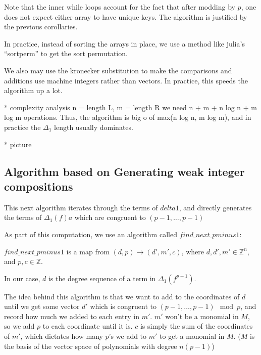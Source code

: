 Note that the inner while loops account for the fact that
after modding by \(p\), one does not expect 
either array to have unique keys.
The algorithm is justified by the previous corollaries.

In practice, instead of sorting the arrays in place, 
we use a method like julia's ``sortperm''
to get the sort permutation.

We also may use the kronecker substitution to make
the comparisons and additions use machine integers
rather than vectors.
In practice, this speeds the algorithm up a lot.

* complexity analysis
n = length L, m = length R
we need n + m + n log n + m log m operations.
Thus, the algorithm is big o of max(n log n, m log m),
and in practice the \(\Delta_{1}\) length
usually dominates.

* picture

\subsection{Algorithm based on Generating weak integer compositions}

This next algorithm iterates through the terms of $delta1$, and directly generates the terms of $\Delta_1(f)a$ which are congruent to $(p - 1, \dots, p - 1)$

As part of this computation, we use an algorithm called $find\_next\_pminus1$:

\begin{alg}
    $find\_next\_pminus1$ is a map from $(d, p) \rightarrow (d', m', c)$, where $d, d', m' \in \mathbb{Z}^n$, and $p, c \in \mathbb{Z}$.
\end{alg}

In our case, $d$ is the degree sequence of a term in $\Delta_{1}(f ^ {p - 1})$.

The idea behind this algorithm is that we want to add to the coordinates of $d$ until we get some vector $d'$ which is congruent to $(p - 1, \dots, p - 1) \mod p$, and record how much we added to each entry in $m'$. $m'$ won't be a monomial in $M$, so we add $p$ to each coordinate until it is. $c$ is simply the sum of the coordinates of $m'$, which dictates how many $p$'s we add to $m'$ to get a monomial in $M$. ($M$ is the basis of the vector space of polynomials with degree $n(p - 1)$)

